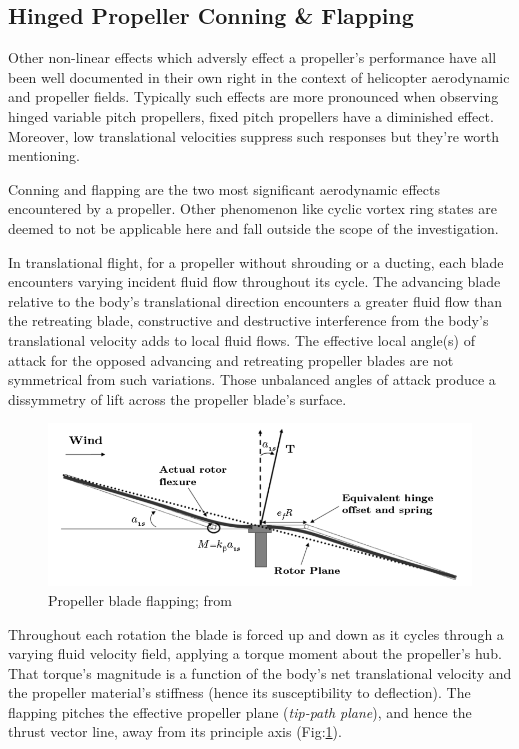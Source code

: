\subsection{Hinged Propeller Conning \& Flapping}
\label{subsec:dynamics.aero.flap}
Other non-linear effects which adversly effect a propeller's performance have all been well documented in their own right in the context of helicopter aerodynamic and propeller fields\cite{basichelicopter,bramwell}. Typically such effects are more pronounced when observing hinged variable pitch propellers, fixed pitch propellers have a diminished effect. Moreover, low translational velocities suppress such responses but they're worth mentioning.
\par
Conning and flapping are the two most significant aerodynamic effects encountered by a propeller. Other phenomenon like cyclic vortex ring states are deemed to not be applicable here and fall outside the scope of the investigation. 
\par
In translational flight, for a propeller without shrouding or a ducting, each blade encounters varying incident fluid flow throughout its cycle. The advancing blade relative to the body's translational direction encounters a greater fluid flow than the retreating blade, constructive and destructive interference from the body's translational velocity adds to local fluid flows. The effective local angle(s) of attack for the opposed advancing and retreating propeller blades are not symmetrical from such variations. Those unbalanced angles of attack produce a dissymmetry of lift across the propeller blade's surface.
\par
\begin{figure}[htbp]
\centering
\includegraphics[width=\textwidth]{figs/prop-flap}
\caption{Propeller blade flapping; from \cite{starmac}}
\label{fig:prop-flap}
\end{figure}
\par
Throughout each rotation the blade is forced up and down as it cycles through a varying fluid velocity field, applying a torque moment about the propeller's hub. That torque's magnitude is a function of the body's net translational velocity and the propeller material's stiffness (hence its susceptibility to deflection). The flapping pitches the effective propeller plane (\emph{tip-path plane}), and hence the thrust vector line, away from its principle axis (Fig:\ref{fig:prop-flap}).
